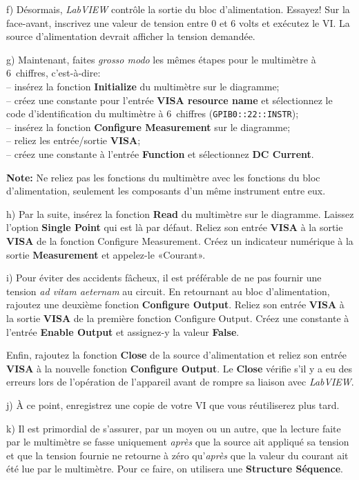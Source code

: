 \documentclass[canadien,12pt,oneside,letterpaper]{article}
\begin{document}
f) Désormais, \textit{LabVIEW} contrôle la sortie du bloc d'alimentation. Essayez! Sur la face-avant, inscrivez une valeur de tension entre 0 et 6 volts et exécutez le VI. La source d'alimentation devrait afficher la tension demandée.

g) Maintenant, faites \textit{grosso modo} les mêmes étapes pour le multimètre à 6\textonehalf~chiffres, c'est-à-dire:\\
-- insérez la fonction \textbf{Initialize} du multimètre sur le diagramme;\\
-- créez une constante pour l'entrée \textbf{VISA resource name} et sélectionnez le code d'identification du multimètre à 6\textonehalf~chiffres (\verb+GPIB0::22::INSTR+);\\
-- insérez la fonction \textbf{Configure Measurement} sur le diagramme;\\
-- reliez les entrée/sortie \textbf{VISA};\\
-- créez une constante à l'entrée \textbf{Function} et sélectionnez \textbf{DC Current}.

\textbf{Note:} Ne reliez pas les fonctions du multimètre avec les fonctions du bloc d'alimentation, seulement les composants d'un même instrument entre eux.

h) Par la suite, insérez la fonction \textbf{Read} du multimètre sur le diagramme. Laissez l'option \textbf{Single Point} qui est là par défaut. Reliez son entrée \textbf{VISA} à la sortie \textbf{VISA} de la fonction Configure Measurement. Créez un indicateur numérique à la sortie \textbf{Measurement} et appelez-le «Courant».

i) Pour éviter des accidents fâcheux, il est préférable de ne pas fournir une tension \textit{ad vitam aeternam} au circuit. En retournant au bloc d'alimentation, rajoutez une deuxième fonction \textbf{Configure Output}. Reliez son entrée \textbf{VISA} à la sortie \textbf{VISA} de la première fonction Configure Output. Créez une constante à l'entrée \textbf{Enable Output} et assignez-y la valeur \textbf{False}.

Enfin, rajoutez la fonction \textbf{Close} de la source d'alimentation et reliez son entrée \textbf{VISA} à la nouvelle fonction \textbf{Configure Output}. Le \textbf{Close} vérifie s'il y a eu des erreurs lors de l'opération de l'appareil avant de rompre sa liaison avec \textit{LabVIEW}.

j) À ce point, enregistrez une copie de votre VI que vous réutiliserez plus tard.

k) Il est primordial de s'assurer, par un moyen ou un autre, que la lecture faite par le multimètre se fasse uniquement \textit{après} que la source ait appliqué sa tension et que la tension fournie ne retourne à zéro qu'\textit{après} que la valeur du courant ait été lue par le multimètre. Pour ce faire, on utilisera une \textbf{Structure Séquence}.
\end{document}
